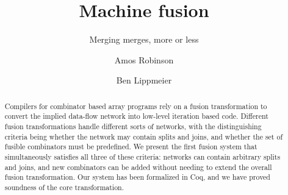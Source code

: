 \documentclass[acmlarge,review]{acmart}\settopmatter{printfolios=true}
\begin{document}
\title{Machine fusion}
\subtitle{Merging merges, more or less}

\author{Amos Robinson}

\author{Ben Lippmeier}

\makeatactive
\begin{abstract}
Compilers for combinator based array programs rely on a fusion transformation to convert the implied data-flow network into low-level iteration based code. Different fusion transformations handle different sorts of networks, with the distinguishing criteria being whether the network may contain splits and joins, and whether the set of fusible combinators must be predefined. We present the first fusion system that simultaneously satisfies all three of these criteria: networks can contain arbitrary splits and joins, and new combinators can be added without needing to extend the overall fusion transformation. Our system has been formalized in Coq, and we have proved soundness of the core transformation.
\end{abstract}


\maketitle













\end{document}
